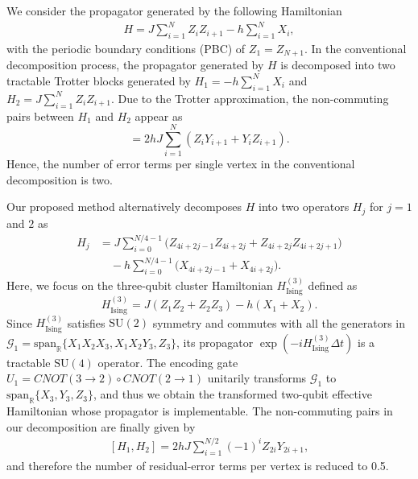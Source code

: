 \documentclass[aps,showpacs,amsmath,amssymb,twocolumn,prx,longbibliography,superscriptaddress,notitlepage,floatfix,10pt]{revtex4-2}
\begin{document}
We consider the propagator generated by the following Hamiltonian 
\begin{equation}
\begin{split}
    H = J\sum_{i=1}^{N} Z_{i}Z_{i+1} - h\sum_{i=1}^{N}X_{i},
\end{split}
\end{equation}
with the periodic boundary conditions (PBC) of $Z_{1}=Z_{N+1}$.
In the conventional decomposition process, the propagator generated by $H$ is decomposed into two tractable Trotter blocks generated by $H_{1}=-h\sum_{i=1}^{N}X_{i}$ and $H_{2}=J\sum_{i=1}^{N}Z_{i}Z_{i+1}$. Due to the Trotter approximation, the non-commuting pairs between $H_{1}$ and $H_{2}$ appear as
\begin{equation}
[H_{1},H_{2}]=2hJ\sum_{i=1}^{N}(Z_{i}Y_{i+1}+Y_{i}Z_{i+1}).\label{eq:Ising_commut}
\end{equation}
Hence, the number of error terms per single vertex in the conventional decomposition is two.

Our proposed method alternatively decomposes $H$ into two operators $H_{j}$ for $j=1$ and $2$ as
\begin{equation}
\begin{split}
    H_{j}&=J\sum_{i=0}^{N/4-1}\bigl(Z_{4i+2j-1}Z_{4i+2j}+Z_{4i+2j}Z_{4i+2j+1}\bigr)\\
    &\quad-h\sum_{i=0}^{N/4-1}\bigl(X_{4i+2j-1}+X_{4i+2j}\bigr).
\end{split}
\end{equation}
Here, we focus on the three-qubit cluster Hamiltonian $H_{\mathrm{Ising}}^{(3)}$ defined as
\begin{equation}
    H_{\mathrm{Ising}}^{(3)}=J(Z_{1}Z_{2}+Z_{2}Z_{3})-h(X_{1}+X_{2}).
\end{equation}
Since $H_{\mathrm{Ising}}^{(3)}$ satisfies $\mathrm{SU}(2)$ symmetry and commutes with all the generators in $\mathcal{G}_{1}=\mathrm{span}_{\mathbb{R}}\bigl\{X_{1}X_{2}X_{3},X_{1}X_{2}Y_{3},Z_{3}\bigr\}$, its propagator $\exp(-iH_{\mathrm{Ising}}^{(3)}\Delta t)$ is a tractable $\mathrm{SU}(4)$ operator. The encoding gate $U_{1}=CNOT(3\rightarrow2)\circ CNOT(2\rightarrow1)$ unitarily transforms $\mathcal{G}_{1}$ to $\mathrm{span}_{\mathbb{R}}\bigl\{X_{3},Y_{3},Z_{3}\bigr\}$, and thus we obtain the transformed two-qubit effective Hamiltonian whose propagator is implementable.
The non-commuting pairs in our decomposition are finally given by
\begin{equation}
\begin{split}
    [H_{1},H_{2}]=2hJ\sum_{i=1}^{N/2}(-1)^{i}Z_{2i}Y_{2i+1},
\end{split}
\end{equation}
and therefore the number of residual-error terms per vertex is reduced to 0.5.
\end{document}

